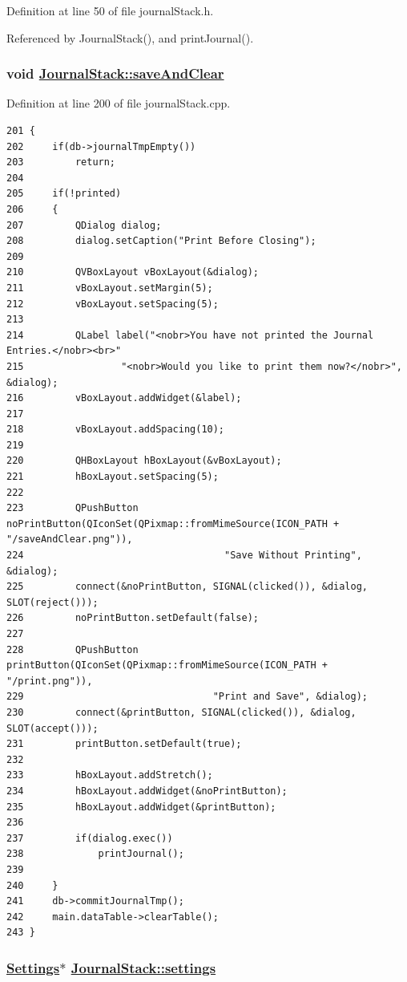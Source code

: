 Definition at line 50 of file journal\-Stack.h.

Referenced by Journal\-Stack(), and print\-Journal().\hypertarget{classJournalStack_r10}{
\subsubsection[saveAndClear]{\setlength{\rightskip}{0pt plus 5cm}void \hyperlink{classJournalStack_r10}{Journal\-Stack::save\-And\-Clear}}}
\label{classJournalStack_r10}


Definition at line 200 of file journal\-Stack.cpp.

\footnotesize\begin{verbatim}201 {
202     if(db->journalTmpEmpty())
203         return;
204 
205     if(!printed)
206     {
207         QDialog dialog;
208         dialog.setCaption("Print Before Closing");
209 
210         QVBoxLayout vBoxLayout(&dialog);
211         vBoxLayout.setMargin(5);
212         vBoxLayout.setSpacing(5);
213 
214         QLabel label("<nobr>You have not printed the Journal Entries.</nobr><br>"
215                 "<nobr>Would you like to print them now?</nobr>", &dialog);
216         vBoxLayout.addWidget(&label);
217 
218         vBoxLayout.addSpacing(10);
219 
220         QHBoxLayout hBoxLayout(&vBoxLayout);
221         hBoxLayout.setSpacing(5);
222 
223         QPushButton noPrintButton(QIconSet(QPixmap::fromMimeSource(ICON_PATH + "/saveAndClear.png")),
224                                   "Save Without Printing", &dialog);
225         connect(&noPrintButton, SIGNAL(clicked()), &dialog, SLOT(reject()));
226         noPrintButton.setDefault(false);
227 
228         QPushButton printButton(QIconSet(QPixmap::fromMimeSource(ICON_PATH + "/print.png")),
229                                 "Print and Save", &dialog);
230         connect(&printButton, SIGNAL(clicked()), &dialog, SLOT(accept()));
231         printButton.setDefault(true);
232 
233         hBoxLayout.addStretch();
234         hBoxLayout.addWidget(&noPrintButton);
235         hBoxLayout.addWidget(&printButton);
236 
237         if(dialog.exec())
238             printJournal();
239 
240     }
241     db->commitJournalTmp();
242     main.dataTable->clearTable();
243 }
\end{verbatim}\normalsize 


\hypertarget{classJournalStack_r1}{
\subsubsection[settings]{\setlength{\rightskip}{0pt plus 5cm}\hyperlink{classSettings}{Settings}$\ast$ \hyperlink{classJournalStack_r1}{Journal\-Stack::settings}}}
\label{classJournalStack_r1}



